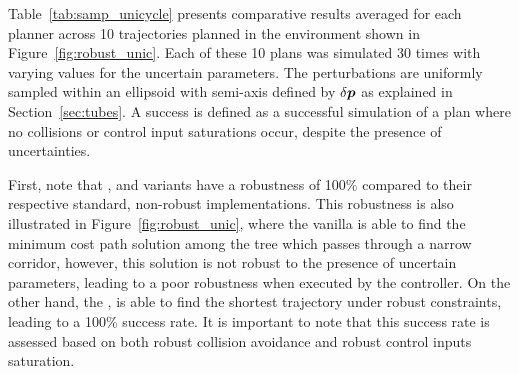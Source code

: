Table~\ref{tab:samp_unicycle} presents comparative results averaged for each planner across 10 trajectories planned in the environment shown in Figure~\ref{fig:robust_unic}. 
Each of these 10 plans was simulated 30 times with varying values for the uncertain parameters.
The perturbations are uniformly sampled within an ellipsoid with semi-axis defined by $\delta \boldsymbol{p}$ as explained in Section~\ref{sec:tubes}.
A success is defined as a successful simulation of a plan where no collisions or control input saturations occur, despite the presence of uncertainties.

First, note that , and  variants have a robustness of 100\% compared to their respective standard, non-robust implementations.
This robustness is also illustrated in Figure~\ref{fig:robust_unic}, where the vanilla  is able to find the minimum cost path solution among the tree which passes through a narrow corridor, however, this solution is not robust to the presence of uncertain parameters, leading to a poor robustness when executed by the controller.
On the other hand, the , is able to find the shortest trajectory under robust constraints, leading to a 100\% success rate.
It is important to note that this success rate is assessed based on both robust collision avoidance and robust control inputs saturation.

